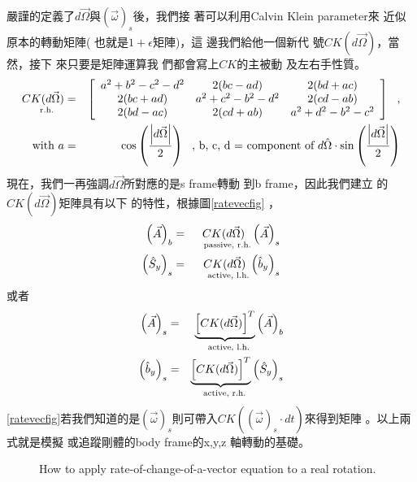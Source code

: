 \documentclass[12pt,a4paper]{article}
\begin{document}
嚴謹的定義了$d\vec{\Omega}$與$%
\left( \vec{\omega}\right) _{s}$後，我們接%
著可以利用Calvin Klein parameter來%
近似原本的轉動矩陣(%
也就是$1+\epsilon $矩陣)，這%
邊我們給他一個新代%
號$CK(d\vec{\Omega})$，當然，接下%
來只要是矩陣運算我%
們都會寫上$CK$的主被動%
及左右手性質。%
\begin{eqnarray*}
\underset{\text{r.h.}}{CK(d\vec{\Omega})} &=&\left[ 
\begin{array}{ccc}
a^{2}+b^{2}-c^{2}-d^{2} & 2(bc-ad) & 2(bd+ac) \\ 
2(bc+ad) & a^{2}+c^{2}-b^{2}-d^{2} & 2(cd-ab) \\ 
2(bd-ac) & 2(cd+ab) & a^{2}+d^{2}-b^{2}-c^{2}%
\end{array}%
\right] \text{,} \\
\text{with }a &=&\cos \left( \frac{\left\vert d\vec{\Omega}\right\vert }{2}%
\right) \text{, b, c, d = component of }d\hat{\Omega}\cdot \sin \left( \frac{%
\left\vert d\vec{\Omega}\right\vert }{2}\right) 
\end{eqnarray*}%
現在，我們一再強調$d%
\vec{\Omega}$所對應的是s frame轉動%
到b frame，因此我們建立%
的$CK(d\vec{\Omega})$矩陣具有以下%
的特性，根據圖\ref{ratevecfig}%
，%
\begin{eqnarray*}
\left( \vec{A}\right) _{b} &=&\underset{\text{passive, r.h.}}{CK(d\vec{\Omega%
})}\left( \vec{A}\right) _{s} \\
\left( \hat{S}_{y}\right) _{s} &=&\underset{\text{active, l.h.}}{CK(d\vec{%
\Omega})}\left( \hat{b}_{y}\right) _{s}
\end{eqnarray*}%
或者%
\begin{eqnarray}
\left( \vec{A}\right) _{s} &=&\underset{\text{active, l.h.}}{\underbrace{%
\left[ CK(d\vec{\Omega})\right] ^{T}}}\left( \vec{A}\right) _{b}
\label{frametrans} \\
\left( \hat{b}_{y}\right) _{s} &=&\underset{\text{active, r.h.}}{\underbrace{%
\left[ CK(d\vec{\Omega})\right] ^{T}}}\left( \hat{S}_{y}\right) _{s}
\label{vecrot}
\end{eqnarray}%
\ref{ratevecfig}若我們知道的是$%
\left( \vec{\omega}\right) _{s}$則可帶入$CK(\left( 
\vec{\omega}\right) _{s}\cdot dt)$來得到矩陣%
。以上兩式就是模擬%
或追蹤剛體的body frame的x,y,z%
軸轉動的基礎。

\begin{figure}[th]
\caption{How to apply rate-of-change-of-a-vector equation to a real
rotation. }
\label{szsbtdtfig}
\begin{center}
\end{center}
\end{figure}
\end{document}
